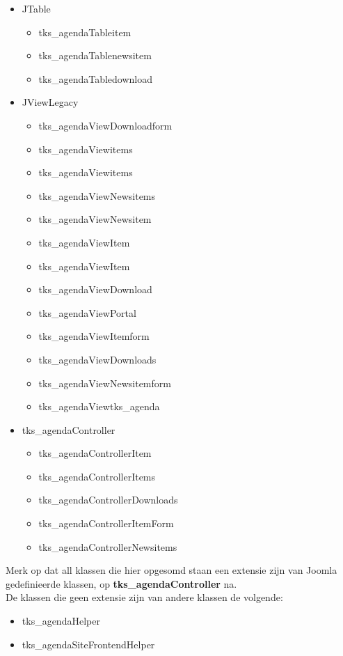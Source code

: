 \documentclass{article}
\begin{document}
\begin{itemize}
\item JTable
\begin{itemize}
	\item tks\_agendaTableitem  
	\item tks\_agendaTablenewsitem  
	\item tks\_agendaTabledownload 
\end{itemize}
\item JViewLegacy
\begin{itemize}
	\item tks\_agendaViewDownloadform
	\item tks\_agendaViewitems
	\item tks\_agendaViewitems
	\item tks\_agendaViewNewsitems
	\item tks\_agendaViewNewsitem
	\item tks\_agendaViewItem 
	\item tks\_agendaViewItem
	\item tks\_agendaViewDownload
	\item tks\_agendaViewPortal  
	\item tks\_agendaViewItemform
	\item tks\_agendaViewDownloads
	\item tks\_agendaViewNewsitemform
	\item tks\_agendaViewtks\_agenda
\end{itemize}
\item tks\_agendaController
\begin{itemize}
	\item tks\_agendaControllerItem  
	\item tks\_agendaControllerItems 
	\item tks\_agendaControllerDownloads 
	\item tks\_agendaControllerItemForm
	\item tks\_agendaControllerNewsitems 
\end{itemize}
\end{itemize}

Merk op dat all klassen die hier opgesomd staan een extensie zijn van Joomla gedefinieerde klassen, op \textbf{tks\_agendaController} na. \\
De klassen die geen extensie zijn van andere klassen de volgende: \\

\begin{itemize}
\item tks\_agendaHelper    
\item tks\_agendaSiteFrontendHelper    
\end{itemize}
\end{document}
